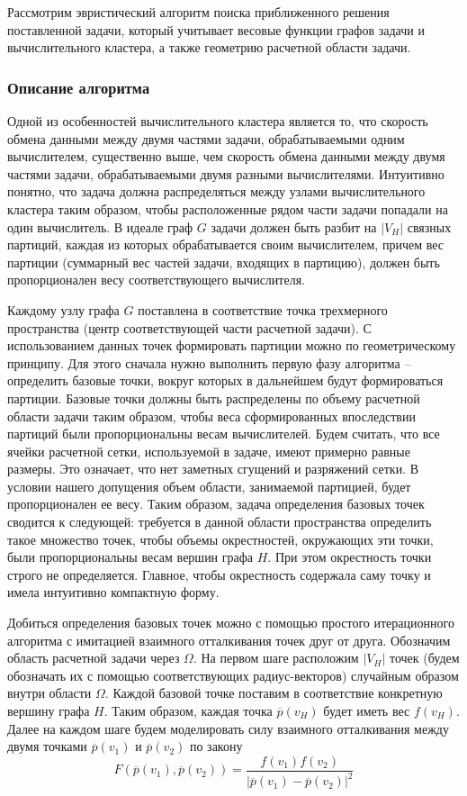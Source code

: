 Рассмотрим эвристический алгоритм поиска приближенного решения поставленной задачи, который учитывает весовые функции графов задачи и вычислительного кластера, а также геометрию расчетной области задачи.

\subsubsection{Описание алгоритма}

Одной из особенностей вычислительного кластера является то, что скорость обмена данными между двумя частями задачи, обрабатываемыми одним вычислителем, существенно выше, чем скорость обмена данными между двумя частями задачи, обрабатываемыми двумя разными вычислителями.
Интуитивно понятно, что задача должна распределяться между узлами вычислительного кластера таким образом, чтобы расположенные рядом части задачи попадали на один вычислитель.
В идеале граф $G$ задачи должен быть разбит на $|V_H|$ связных партиций, каждая из которых обрабатывается своим вычислителем, причем вес партиции (суммарный вес частей задачи, входящих в партицию), должен быть пропорционален весу соответствующего вычислителя.

Каждому узлу графа $G$ поставлена в соответствие точка трехмерного пространства (центр соответствующей части расчетной задачи). 
С использованием данных точек формировать партиции можно по геометрическому принципу. Для этого сначала нужно выполнить первую фазу алгоритма -- определить базовые точки, вокруг которых в дальнейшем будут формироваться партиции.
Базовые точки должны быть распределены по объему расчетной области задачи таким образом, чтобы веса сформированных впоследствии партиций были пропорциональны весам вычислителей.
Будем считать, что все ячейки расчетной сетки, используемой в задаче, имеют примерно равные размеры.
Это означает, что нет заметных сгущений и разряжений сетки.
В условии нашего допущения объем области, занимаемой партицией, будет пропорционален ее весу.
Таким образом, задача определения базовых точек сводится к следующей: требуется в данной области пространства определить такое множество точек, чтобы объемы окрестностей, окружающих эти точки, были пропорциональны весам вершин графа $H$.
При этом окрестность точки строго не определяется.
Главное, чтобы окрестность содержала саму точку и имела интуитивно компактную форму.

Добиться определения базовых точек можно с помощью простого итерационного алгоритма с имитацией взаимного отталкивания точек друг от друга.
Обозначим область расчетной задачи через $\Omega$.
На первом шаге расположим $|V_H|$ точек (будем обозначать их с помощью соответствующих радиус-векторов) случайным образом внутри области $\Omega$.
Каждой базовой точке поставим в соответствие конкретную вершину графа $H$.
Таким образом, каждая точка $\overline{p}(v_H)$ будет иметь вес $f(v_H)$.
Далее на каждом шаге будем моделировать силу взаимного отталкивания между двумя точками $\overline{p}(v_1)$ и $\overline{p}(v_2)$ по закону
\begin{equation}
	F(\overline{p}(v_1), \overline{p}(v_2)) = \frac{f(v_1) f(v_2)}{|\overline{p}(v_1) - \overline{p}(v_2)|^2}
\end{equation}

